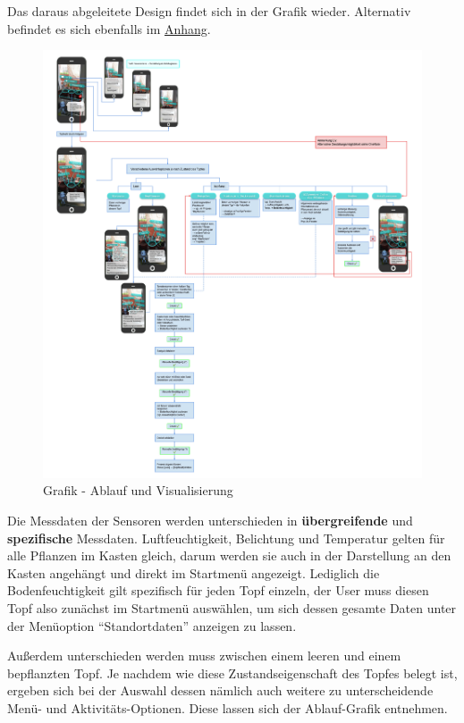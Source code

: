 Das daraus abgeleitete Design findet sich in der Grafik wieder.
Alternativ befindet es sich ebenfalls im
\protect\hyperlink{anhang}{Anhang}.

\begin{figure}
\centering
\includegraphics{img/AblaufVisualisierung_kompr.jpg}
\caption{Grafik - Ablauf und Visualisierung}
\end{figure}

Die Messdaten der Sensoren werden unterschieden in
\textbf{übergreifende} und \textbf{spezifische} Messdaten.
Luftfeuchtigkeit, Belichtung und Temperatur gelten für alle Pflanzen im
Kasten gleich, darum werden sie auch in der Darstellung an den Kasten
angehängt und direkt im Startmenü angezeigt. Lediglich die
Bodenfeuchtigkeit gilt spezifisch für jeden Topf einzeln, der User muss
diesen Topf also zunächst im Startmenü auswählen, um sich dessen gesamte
Daten unter der Menüoption ``Standortdaten'' anzeigen zu lassen.

Außerdem unterschieden werden muss zwischen einem leeren und einem
bepflanzten Topf. Je nachdem wie diese Zustandseigenschaft des Topfes
belegt ist, ergeben sich bei der Auswahl dessen nämlich auch weitere zu
unterscheidende Menü- und Aktivitäts-Optionen. Diese lassen sich der
Ablauf-Grafik entnehmen.

